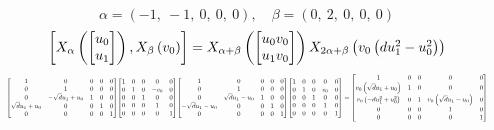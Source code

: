 \documentclass[11pt]{article}
\theoremstyle{definition}
\begin{document}
\[
\alpha = \left( -1, \  -1, \  0, \  0, \  0\right), \quad \beta = \left( 0, \  2, \  0, \  0, \  0\right)
\]
\[
\scaletoalign{\textwidth}{\left[ X_{\alpha}\left(\left[\begin{matrix}u_{0}\\u_{1}\end{matrix}\right]\right), X_{\beta}\left(v_{0}\right) \right] = X_{\alpha + \beta}\left(\left[\begin{matrix}u_{0} v_{0}\\u_{1} v_{0}\end{matrix}\right]\right) X_{2\alpha + \beta}\left(v_{0} \left(d u_{1}^{2} - u_{0}^{2}\right)\right)}
\]
\[
\scaletoalign{\textwidth}{{\left[\begin{matrix}1 & 0 & 0 & 0 & 0\\0 & 1 & 0 & 0 & 0\\0 & - \sqrt{d} u_{1} + u_{0} & 1 & 0 & 0\\\sqrt{d} u_{1} + u_{0} & 0 & 0 & 1 & 0\\0 & 0 & 0 & 0 & 1\end{matrix}\right]} {\left[\begin{matrix}1 & 0 & 0 & 0 & 0\\0 & 1 & 0 & - v_{0} & 0\\0 & 0 & 1 & 0 & 0\\0 & 0 & 0 & 1 & 0\\0 & 0 & 0 & 0 & 1\end{matrix}\right]} {\left[\begin{matrix}1 & 0 & 0 & 0 & 0\\0 & 1 & 0 & 0 & 0\\0 & \sqrt{d} u_{1} - u_{0} & 1 & 0 & 0\\- \sqrt{d} u_{1} - u_{0} & 0 & 0 & 1 & 0\\0 & 0 & 0 & 0 & 1\end{matrix}\right]} {\left[\begin{matrix}1 & 0 & 0 & 0 & 0\\0 & 1 & 0 & v_{0} & 0\\0 & 0 & 1 & 0 & 0\\0 & 0 & 0 & 1 & 0\\0 & 0 & 0 & 0 & 1\end{matrix}\right]} = {\left[\begin{matrix}1 & 0 & 0 & 0 & 0\\v_{0} \left(\sqrt{d} u_{1} + u_{0}\right) & 1 & 0 & 0 & 0\\v_{0} \left(- d u_{1}^{2} + u_{0}^{2}\right) & 0 & 1 & v_{0} \left(\sqrt{d} u_{1} - u_{0}\right) & 0\\0 & 0 & 0 & 1 & 0\\0 & 0 & 0 & 0 & 1\end{matrix}\right]}}
\]
\end{document}
